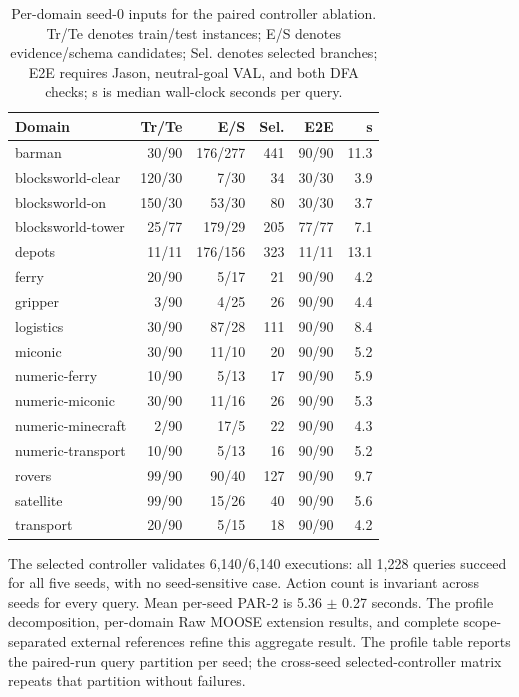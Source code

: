 \begin{table}[htbp]
\centering
\small
\setlength{\tabcolsep}{2.0pt}
\begin{tabular}{lrrrrr}
\toprule
Domain & Tr/Te & E/S & Sel. & E2E & s \\
\midrule
barman & 30/90 & 176/277 & 441 & 90/90 & 11.3 \\
blocksworld-clear & 120/30 & 7/30 & 34 & 30/30 & 3.9 \\
blocksworld-on & 150/30 & 53/30 & 80 & 30/30 & 3.7 \\
blocksworld-tower & 25/77 & 179/29 & 205 & 77/77 & 7.1 \\
depots & 11/11 & 176/156 & 323 & 11/11 & 13.1 \\
ferry & 20/90 & 5/17 & 21 & 90/90 & 4.2 \\
gripper & 3/90 & 4/25 & 26 & 90/90 & 4.4 \\
logistics & 30/90 & 87/28 & 111 & 90/90 & 8.4 \\
miconic & 30/90 & 11/10 & 20 & 90/90 & 5.2 \\
numeric-ferry & 10/90 & 5/13 & 17 & 90/90 & 5.9 \\
numeric-miconic & 30/90 & 11/16 & 26 & 90/90 & 5.3 \\
numeric-minecraft & 2/90 & 17/5 & 22 & 90/90 & 4.3 \\
numeric-transport & 10/90 & 5/13 & 16 & 90/90 & 5.2 \\
rovers & 99/90 & 90/40 & 127 & 90/90 & 9.7 \\
satellite & 99/90 & 15/26 & 40 & 90/90 & 5.6 \\
transport & 20/90 & 5/15 & 18 & 90/90 & 4.2 \\
\bottomrule
\end{tabular}
\caption{Per-domain seed-0 inputs for the paired controller ablation. Tr/Te
denotes train/test instances; E/S denotes evidence/schema candidates; Sel.
denotes selected branches; E2E requires Jason, neutral-goal VAL, and both DFA
checks; s is median wall-clock seconds per query.}
\label{tab:domain-results}
\end{table}

The selected controller validates
6,140/6,140 executions: all 1,228 queries succeed for all five seeds, with no
seed-sensitive case. Action count is
invariant across seeds for every query. Mean per-seed PAR-2 is
5.36 $\pm$ 0.27 seconds. The profile decomposition,
per-domain Raw MOOSE extension results, and complete scope-separated external
references refine this aggregate result.
The profile table reports the paired-run query partition per seed; the
cross-seed selected-controller matrix repeats that partition without failures.

